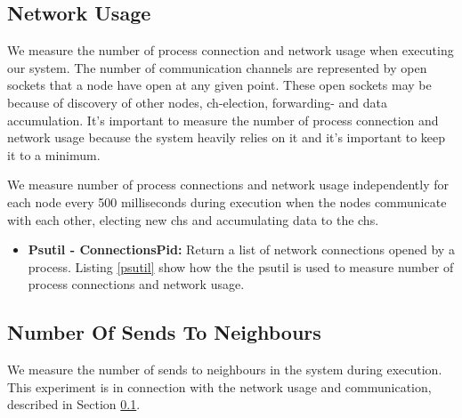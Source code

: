 \documentclass[USenglish]{uit-thesis}
\begin{document}


\subsection{Network Usage} \label{eva:net_measure}
We measure the number of process connection and network usage when executing our system. The number of communication channels are represented by open sockets that a node have open at any given point. These open sockets may be because of discovery of other nodes, \gls{ch}-election, forwarding- and data accumulation. It's important to measure the number of process connection and network usage because the system heavily relies on it and it's important to keep it to a minimum.


We measure number of process connections and network usage independently for each node every 500 milliseconds during execution when the nodes communicate with each other, electing new \glspl{ch} and accumulating data to the \glspl{ch}.

\begin{itemize}
\item \textbf{Psutil - ConnectionsPid:} Return a list of network connections opened by a process. Listing \ref{psutil} show how the the psutil is used to measure number of process connections and network usage.
\end{itemize}



\subsection{Number Of Sends To Neighbours} \label{eva:num_sends}
We measure the number of sends to neighbours in the system during execution. This experiment is in connection with the network usage and communication, described in Section \ref{eva:net_measure}. 
\end{document}
